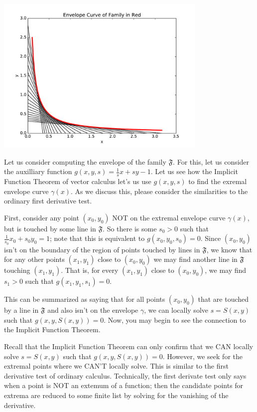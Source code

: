 \includegraphics[width = 4.0in]{multiVarDiffCalc/hyperbolaEnvelope.pdf}

Let us consider computing the envelope of the family \(\mathfrak F\). For this, let us consider the auxilliary function
\(g(x,y,s) = \frac{1}{s} x + s y - 1\). Let us see how the Implicit Function Theorem of vector calculus let's us
use \(g(x,y, s)\) to find the exremal envelope curve \(\gamma(x)\). As we discuss this, please consider the similarities to the ordinary first derivative test.

First, consider any point \((x_0, y_0)\) NOT on the extremal envelope curve \(\gamma(x)\), but is touched by some line in \(\mathfrak F\). 
So there is some \(s_0 > 0\) such that \(\frac{1}{s_0} x_0 + s_0 y_0 = 1\); note that this is equivalent to \(g(x_0, y_0, s_0) = 0\). 
Since \((x_0, y_0)\) isn't on the boundary of the region of points touched by lines in \(\mathfrak F\), we know that for any other points \((x_1, y_1)\) close to \((x_0, y_0)\) we may find another line in \(\mathfrak F\) touching \((x_1, y_1)\). 
That is, for every \((x_1, y_1)\) close to \((x_0, y_0)\), we may find \(s_1 > 0\) such that \(g(x_1, y_1, s_1) = 0\).  

This can be summarized as saying that for all points \((x_0, y_0)\) that are touched by a line in \(\mathfrak F\) and also isn't on the envelope \(\gamma\), we can locally solve \(s = S(x,y)\) such that \(g(x, y, S(x, y)) = 0\). Now, you may begin to see the connection to the Implicit Function Theorem.

Recall that the Implicit Function Theorem can only confirm that we CAN locally solve \(s = S(x,y)\) such that \(g(x, y, S(x, y)) = 0\). However, we seek for the extremal points where we CAN'T locally solve. This is similar to the first derivative test of ordinary calculus. Technically, the first derivate test only says when a point is NOT an extemum of a function; then the candidate points for extrema are reduced to some finite list by solving for the vanishing of the derivative.

